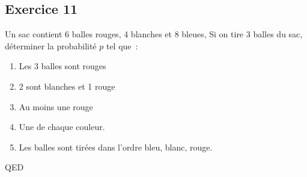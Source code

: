 \documentclass[]{book}
\theoremstyle{definition}
\begin{document}
\subsection*{Exercice 11}
Un sac contient 6 balles rouges, 4 blanches et 8 bleues, Si on tire 3 balles du sac, d\'eterminer la probabilit\'e $p$ tel que\ :
\begin{enumerate}
\item Les 3 balles sont rouges
\item 2 sont blanches et 1 rouge 
\item Au moins une rouge
\item Une de chaque couleur.
\item Les balles sont tir\'ees dans l'ordre bleu, blanc, rouge.
\end{enumerate}






QED
\end{document}
